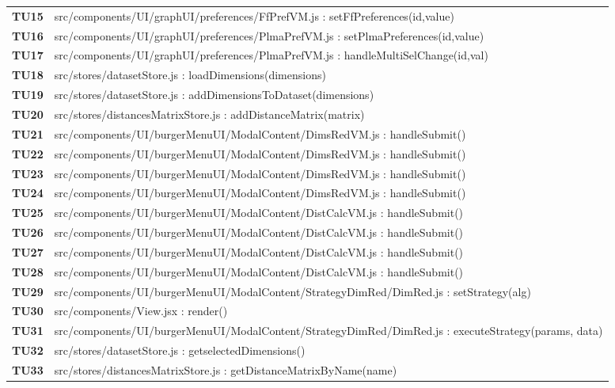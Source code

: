 {\begin{longtable}{C{1.1cm} | L{15cm}}
	\textbf{TU15} & src/components/UI/graphUI/preferences/FfPrefVM.js : setFfPreferences(id,value)\\
	\textbf{TU16} & src/components/UI/graphUI/preferences/PlmaPrefVM.js : setPlmaPreferences(id,value)\\
\textbf{TU17} & src/components/UI/graphUI/preferences/PlmaPrefVM.js : handleMultiSelChange(id,val)\\
\textbf{TU18} & src/stores/datasetStore.js : loadDimensions(dimensions)\\
\textbf{TU19} & src/stores/datasetStore.js : addDimensionsToDataset(dimensions)\\
\textbf{TU20} & src/stores/distancesMatrixStore.js : addDistanceMatrix(matrix)\\
\textbf{TU21} & src/components/UI/burgerMenuUI/ModalContent/DimsRedVM.js : handleSubmit()\\
\textbf{TU22} & src/components/UI/burgerMenuUI/ModalContent/DimsRedVM.js : handleSubmit()\\
\textbf{TU23} & src/components/UI/burgerMenuUI/ModalContent/DimsRedVM.js : handleSubmit()\\
\textbf{TU24} & src/components/UI/burgerMenuUI/ModalContent/DimsRedVM.js : handleSubmit()\\

\textbf{TU25} & src/components/UI/burgerMenuUI/ModalContent/DistCalcVM.js : handleSubmit()\\
\textbf{TU26} & src/components/UI/burgerMenuUI/ModalContent/DistCalcVM.js : handleSubmit()\\
\textbf{TU27} & src/components/UI/burgerMenuUI/ModalContent/DistCalcVM.js : handleSubmit()\\
\textbf{TU28} & src/components/UI/burgerMenuUI/ModalContent/DistCalcVM.js : handleSubmit()\\

\textbf{TU29} & src/components/UI/burgerMenuUI/ModalContent/StrategyDimRed/DimRed.js : setStrategy(alg)\\

\textbf{TU30} & src/components/View.jsx : render()\\

\textbf{TU31} & src/components/UI/burgerMenuUI/ModalContent/StrategyDimRed/DimRed.js : executeStrategy(params, data)\\ 

\textbf{TU32} & src/stores/datasetStore.js : getselectedDimensions()\\

\textbf{TU33} & src/stores/distancesMatrixStore.js : getDistanceMatrixByName(name)\\


\end{longtable}}
